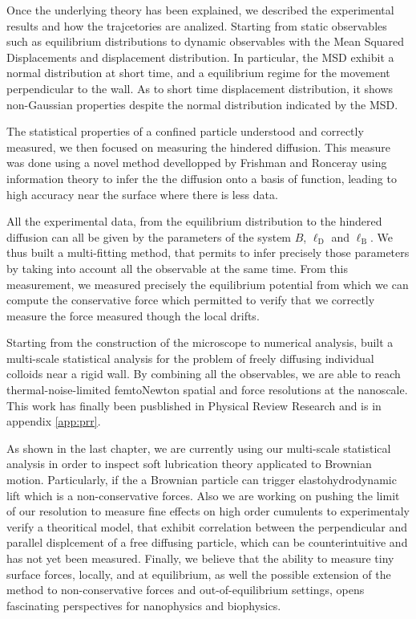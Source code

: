 Once the underlying theory has been explained, we described the experimental results and how the trajcetories are analized. Starting from static observables such as equilibrium distributions to dynamic observables with the Mean Squared Displacements and displacement distribution. In particular, the \gls{MSD} exhibit a normal distribution at short time, and a equilibrium regime for the movement perpendicular to the wall. As to short time displacement distribution, it shows non-Gaussian properties despite the normal distribution indicated by the \gls{MSD}.

The statistical properties of a confined particle understood and correctly measured, we then focused on measuring the hindered diffusion. This measure was done using a novel method devellopped by Frishman and Ronceray \cite{frishman_learning_2020} using information theory to infer the the diffusion onto a basis of function, leading to high accuracy near the surface where there is less data. 

All the experimental data, from the equilibrium distribution to the hindered diffusion can all be given by the parameters of the system $B$, $\ell _\mathrm{D}$ and $\ell_\mathrm{B}$. We thus built a multi-fitting method, that permits to infer precisely those parameters by taking into account all the observable at the same time. From this measurement, we measured precisely the equilibrium potential from which we can compute the conservative force which permitted to verify that we correctly measure the force measured though the local drifts.

Starting from the construction of the microscope to numerical analysis, built a multi-scale statistical analysis for the problem of freely diffusing individual colloids near a rigid wall. By combining all the observables, we are able to reach thermal-noise-limited femtoNewton spatial and force resolutions at the nanoscale. This work has finally been pusblished in Physical Review Research and is in appendix \ref{app:prr}.

As shown in the last chapter, we are currently using our multi-scale statistical analysis in order to inspect soft lubrication theory applicated to Brownian motion. Particularly, if the a Brownian particle can trigger elastohydrodynamic lift which is a non-conservative forces. Also we are working on pushing the limit of our resolution to measure fine effects on high order cumulents to experimentaly verify a theoritical model, that exhibit correlation between the perpendicular and parallel displcement of a free diffusing particle, which can be counterintuitive and has not yet been measured. Finally, we believe that the ability to measure tiny surface forces, locally, and at equilibrium, as well the possible extension of the method to non-conservative forces and out-of-equilibrium settings, opens fascinating perspectives for nanophysics and biophysics.

